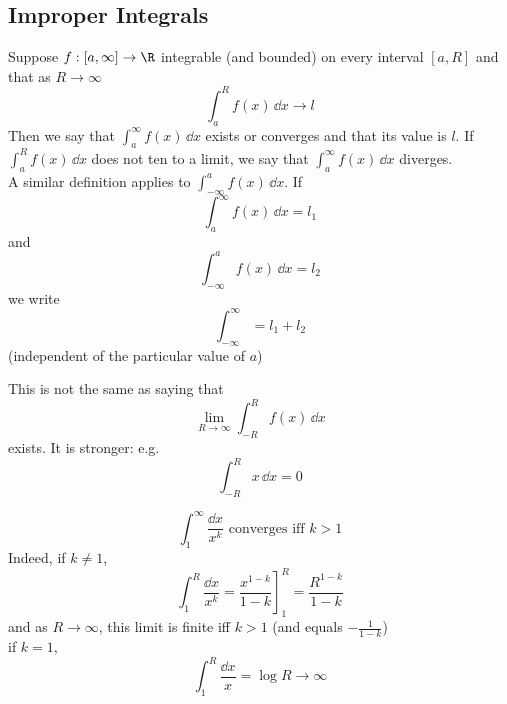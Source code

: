 \subsection{Improper Integrals}
\begin{definition}
Suppose $f:[a,\infty] \to \R$ integrable (and bounded) on every interval $[a,R]$ and that as $R\to \infty$
\[\int_a^R f(x)\,\dd x \to l\]
Then we say that $\int_a^{\infty}f(x)\,\dd x$ exists or converges and that its value is $l$. If $\int_a^Rf(x)\,\dd x$ does not ten to a limit, we say that $\int_a^{\infty}f(x)\,\dd x$ diverges.\\
A similar definition applies to $\int_{-\infty}^af(x)\,\dd x$. If \[\int_a^{\infty}f(x)\,\dd x= l_1\]
and
\[\int_{-\infty}^af(x)\,\dd x = l_2\]
we write
\[\int_{-\infty}^{\infty} = l_1 + l_2\]
(independent of the particular value of $a$)
\end{definition}
\begin{warning}
This is not the same as saying that
\[\lim_{R\to \infty} \int_{-R}^Rf(x)\,\dd x\]
exists. It is stronger: e.g.
\[\int_{-R}^Rx\,\dd x = 0\]
\end{warning}
\begin{example}
\[\int_1^{\infty} \frac{\dd x}{x^k}\text{ converges iff }k>1\]
Indeed, if $k\neq 1$,
\[\int_1^R\frac{\dd x}{x^k} = \left.\frac{x^{1-k}}{1-k}\right ]_1^R = \frac{R^{1-k}}{1-k}\]
and as $R\to \infty$, this limit is finite iff $k>1$ (and equals $-\frac{1}{1-k}$)\\
if $k = 1$,
\[\int_1^R\frac{\dd x}{x} = \log R \to \infty\]
\end{example}
